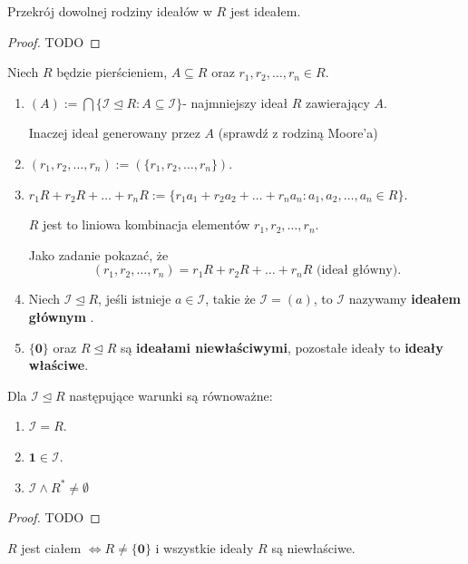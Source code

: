 \begin{fact}

	Przekrój dowolnej rodziny ideałów w $R$ jest ideałem.
\end{fact}
\begin{proof}
	TODO
\end{proof} 
\begin{definition}
	Niech $R$ będzie pierścieniem, $A\subseteq R$ oraz $r_1,r_2,\ldots, r _{n} \in R$.
	\begin{enumerate}[label=\arabic*)]
		\item $\left( A \right) := \bigcap \{\mathcal{I}\unlhd R: A\subseteq \mathcal{I}\} $- najmniejszy ideał $R$ zawierający $A$.

			Inaczej ideał generowany przez  $A$ (sprawdź z rodziną Moore'a)
		\item $\left( r_1,r_2,\ldots,r _{n}  \right) := \left( \{r_1,r_2,\ldots,r_{n}\}  \right) $.
		\item $r_1R + r_2R + \ldots + r_{n}R := \{r_1a_1 + r_2a_2 + \ldots + r_{n}a_{n} : a_1,a_2,\ldots,a_{n} \in R\} $.

			$R$ jest to liniowa kombinacja elementów  $r_1,r_2,\ldots,r_{n}$.

			Jako zadanie pokazać, że 
			\[
				\left( r_1,r_2,\ldots, r_{n} \right) = r_1R + r_2R + \ldots + r_{n}R \text{ (ideał główny)} 
			.\] 
		\item Niech $\mathcal{I}\unlhd R$, jeśli istnieje $a\in \mathcal{I}$, takie że $\mathcal{I}=\left( a \right) $, to $\mathcal{I}$ nazywamy \textbf{ideałem głównym} .
		\item $\{\mathbf{0}\} $ oraz $R\unlhd R$ są \textbf{ideałami niewłaściwymi}, pozostałe ideały to \textbf{ideały właściwe}. 
	\end{enumerate}
\end{definition} 
\begin{fact}
	Dla $\mathcal{I} \unlhd R$ następujące warunki są równoważne:
	\begin{enumerate}[label=\roman*)]
		\item $\mathcal{I} = R$.
		\item $\mathbf{1} \in \mathcal{I}$.
		\item $\mathcal{I}\land R^{\ast} \neq \emptyset $
	\end{enumerate}
\end{fact}
\begin{proof}
	TODO
\end{proof} 
\begin{fact}

	$R$ jest ciałem $\iff R\neq \{\mathbf{0}\} $ i wszystkie ideały $R$ są niewłaściwe.
\end{fact}
